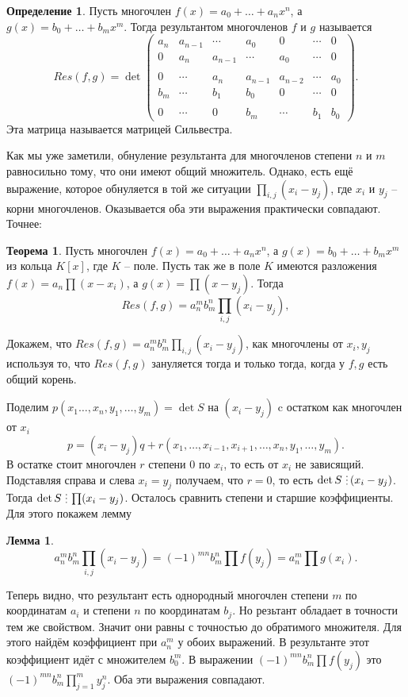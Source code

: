 \documentclass[10pt,a4paper,oneside]{book}
\theoremstyle{definition}
\newtheorem*{defn}{{\color{yellow!30!red} Определение}}
\newtheorem{thm}{{\color{red!40!black} Теорема}}
\newtheorem{lem}{{\color{green!50!black} Лемма}}
\newcommand{\di}{\mathop{\,\scalebox{0.85}{\raisebox{-1.2pt}[0.5\height]{\vdots}}\,}}
\def\thrm{\begin{thm}}
\def\ethrm{\end{thm}}
\def\dfn{\begin{defn}}
\def\edfn{\end{defn}}
\def\lm{\begin{lem}}
\def\elm{\end{lem}}
\begin{document}
\dfn Пусть многочлен $f(x)=a_0+\dots+a_nx^n$, а $g(x)=b_0+\dots+b_mx^m$. Тогда результантом многочленов $f$ и $g$ называется $$Res(f,g)=  \det 
\begin{pmatrix}
a_n & a_{n-1} & \cdots & a_0 & 0 & \cdots & 0 \\
0 & a_n & a_{n-1} & \cdots & a_0 & \cdots & 0 \\
\\
0 & \cdots &  a_n & a_{n-1} & a_{n-2} & \cdots &  a_0 \\
b_m & \cdots & b_1 & b_0 & 0 & \cdots & 0 \\
 \\
0 & \cdots & 0 & b_m & \cdots & b_1 & b_0 
\end{pmatrix}.$$
Эта матрица называется матрицей Сильвестра. 
\edfn

Как мы уже заметили, обнуление результанта для многочленов степени $n$ и $m$ равносильно тому, что они имеют общий множитель. Однако, есть ещё выражение, которое обнуляется в той же ситуации $\prod_{i,j} (x_i-y_j)$, где $x_i$ и $y_j$ -- корни многочленов. Оказывается оба эти выражения практически совпадают. Точнее:

\thrm Пусть многочлен $f(x)=a_0+\dots+a_nx^n$, а $g(x)=b_0+\dots+b_mx^m$ из кольца $K[x]$, где $K$ -- поле. Пусть так же в поле $K$ имеются разложения $f(x)=a_n\prod(x-x_i)$, а $g(x)=\prod (x-y_j)$. Тогда
$$Res(f,g)=a_n^mb_m^n \prod_{i,j} (x_i-y_j),$$
\ethrm
\proof  Докажем, что $Res(f,g)=a_n^mb_m^n \prod_{i,j} (x_i-y_j)$, как многочлены от $x_i, y_j$ используя то, что $Res(f,g)$ зануляется тогда и только тогда, когда у $f,g$ есть общий корень.

Поделим $p(x_1\dots,x_n,y_1,\dots,y_m)=\det S$ на $(x_i-y_j)$ c остатком как многочлен от $x_i$
$$p=(x_i-y_j)q+r(x_1,\dots, x_{i-1},x_{i+1},\dots,x_n,y_1,\dots,y_m).$$
В остатке стоит многочлен $r$ степени 0 по $x_i$, то есть от $x_i$ не зависящий. Подставляя справа и слева $x_i=y_j$ получаем, что $r=0$, то есть $\det S \di (x_i-y_j)$. Тогда $\det S \di \prod (x_i-y_j)$. Осталось сравнить степени и старшие коэффициенты. Для этого покажем лемму

\lm  $$a_n^mb_m^n \prod_{i,j} (x_i-y_j)=(-1)^{mn}b_m^n \prod f(y_j)=a_n^m \prod g(x_i).$$ 
\elm

Теперь видно, что результант есть однородный многочлен степени $m$ по координатам $a_i$ и степени $n$ по координатам $b_j$. Но резьтант обладает в точности тем же свойством. Значит они равны с точностью до обратимого множителя. Для этого найдём коэффициент при $a_n^m$ у обоих выражений. В результанте этот коэффициент идёт с множителем $b_0^m$. В выражении  $(-1)^{mn}b_m^n \prod f(y_j)$ это $(-1)^{mn}b_m^n \prod_{j=1}^m y_j^n$. Оба эти выражения совпадают.
\end{document}
